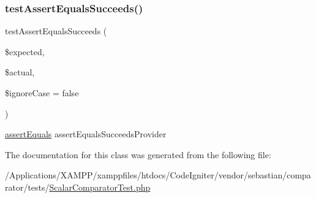 \subsubsection{\texorpdfstring{test\+Assert\+Equals\+Succeeds()}{testAssertEqualsSucceeds()}}
{\footnotesize\ttfamily test\+Assert\+Equals\+Succeeds (\begin{DoxyParamCaption}\item[{}]{\$expected,  }\item[{}]{\$actual,  }\item[{}]{\$ignore\+Case = {\ttfamily false} }\end{DoxyParamCaption})}

\mbox{\hyperlink{_functions_8php_a441ec5f09711b6271edda774132eec5f}{assert\+Equals}}  assert\+Equals\+Succeeds\+Provider 

The documentation for this class was generated from the following file\+:\begin{DoxyCompactItemize}
\item 
/\+Applications/\+X\+A\+M\+P\+P/xamppfiles/htdocs/\+Code\+Igniter/vendor/sebastian/comparator/tests/\mbox{\hyperlink{_scalar_comparator_test_8php}{Scalar\+Comparator\+Test.\+php}}\end{DoxyCompactItemize}
